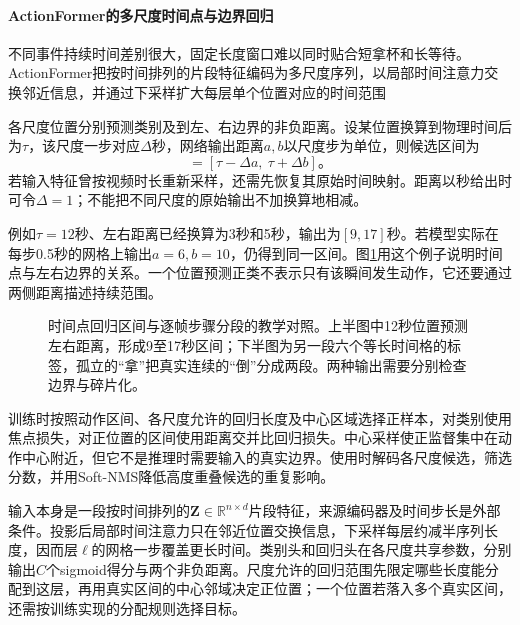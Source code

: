 \paragraph{ActionFormer的多尺度时间点与边界回归}
\label{sec:vision-video-actionformer}

不同事件持续时间差别很大，固定长度窗口难以同时贴合短拿杯和长等待。ActionFormer把按时间排列的片段特征编码为多尺度序列，以局部时间注意力交换邻近信息，并通过下采样扩大每层单个位置对应的时间范围

各尺度位置分别预测类别及到左、右边界的非负距离。设某位置换算到物理时间后为$\tau$，该尺度一步对应$\Delta$秒，网络输出距离$a,b$以尺度步为单位，则候选区间为
\begin{equation}
  [\widehat{\tau}_{\mathrm{s}},\widehat{\tau}_{\mathrm{e}}]
  =[\tau-\Delta a,\ \tau+\Delta b]\text{。}
  \label{eq:vision-video-boundaries}
\end{equation}
若输入特征曾按视频时长重新采样，还需先恢复其原始时间映射。距离以秒给出时可令$\Delta=1$；不能把不同尺度的原始输出不加换算地相减。

例如$\tau=12$秒、左右距离已经换算为3秒和5秒，输出为$[9,17]$秒。若模型实际在每步0.5秒的网格上输出$a=6,b=10$，仍得到同一区间。图\ref{fig:vision-temporal-boundaries}用这个例子说明时间点与左右边界的关系。一个位置预测正类不表示只有该瞬间发生动作，它还要通过两侧距离描述持续范围。

\begin{figure}[htbp]
  \centering
  
  \caption{时间点回归区间与逐帧步骤分段的教学对照。上半图中12秒位置预测左右距离，形成9至17秒区间；下半图为另一段六个等长时间格的标签，孤立的“拿”把真实连续的“倒”分成两段。两种输出需要分别检查边界与碎片化。}
  \label{fig:vision-temporal-boundaries}
\end{figure}

训练时按照动作区间、各尺度允许的回归长度及中心区域选择正样本，对类别使用焦点损失，对正位置的区间使用距离交并比回归损失。中心采样使正监督集中在动作中心附近，但它不是推理时需要输入的真实边界。使用时解码各尺度候选，筛选分数，并用Soft-NMS降低高度重叠候选的重复影响。

输入本身是一段按时间排列的$\bm{Z}\in\mathbb{R}^{n\times d}$片段特征，来源编码器及时间步长是外部条件。投影后局部时间注意力只在邻近位置交换信息，下采样每层约减半序列长度，因而层$\ell$的网格一步覆盖更长时间。类别头和回归头在各尺度共享参数，分别输出$C$个sigmoid得分与两个非负距离。尺度允许的回归范围先限定哪些长度能分配到这层，再用真实区间的中心邻域决定正位置；一个位置若落入多个真实区间，还需按训练实现的分配规则选择目标。

